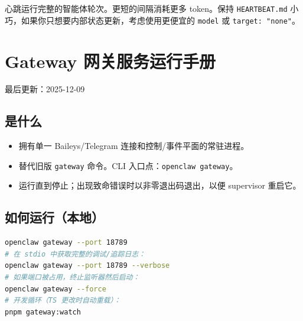 心跳运行完整的智能体轮次。更短的间隔消耗更多 token。保持 \texttt{HEARTBEAT.md} 小巧，如果你只想要内部状态更新，考虑使用更便宜的 \texttt{model} 或 \texttt{target: "none"}。


\clearpage

\section{Gateway 网关服务运行手册}


最后更新：2025-12-09

\subsection{是什么}


\begin{itemize}
  \item 拥有单一 Baileys/Telegram 连接和控制/事件平面的常驻进程。
  \item 替代旧版 \texttt{gateway} 命令。CLI 入口点：\texttt{openclaw gateway}。
  \item 运行直到停止；出现致命错误时以非零退出码退出，以便 supervisor 重启它。
\end{itemize}


\subsection{如何运行（本地）}


\begin{lstlisting}[language=bash]
openclaw gateway --port 18789
# 在 stdio 中获取完整的调试/追踪日志：
openclaw gateway --port 18789 --verbose
# 如果端口被占用，终止监听器然后启动：
openclaw gateway --force
# 开发循环（TS 更改时自动重载）：
pnpm gateway:watch
\end{lstlisting}


